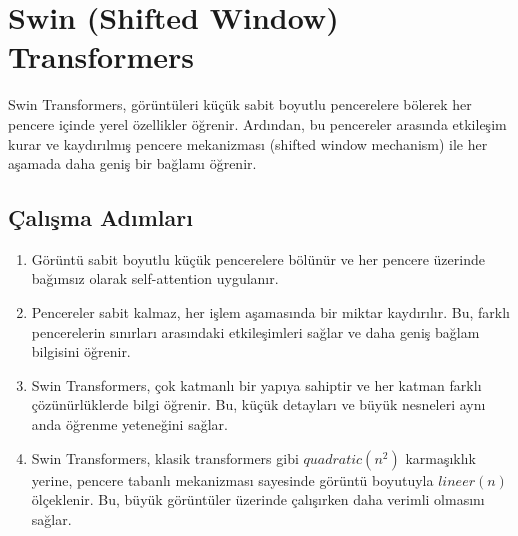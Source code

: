 \section{Swin (Shifted Window) Transformers}

Swin Transformers, görüntüleri küçük sabit boyutlu pencerelere bölerek her pencere içinde yerel özellikler öğrenir. Ardından, bu pencereler arasında etkileşim kurar ve kaydırılmış pencere mekanizması (shifted window mechanism) ile her aşamada daha geniş bir bağlamı öğrenir. 

\subsection{Çalışma Adımları}

\begin{enumerate}
    \item Görüntü sabit boyutlu küçük pencerelere bölünür ve her pencere üzerinde bağımsız olarak self-attention uygulanır.
    \item Pencereler sabit kalmaz, her işlem aşamasında bir miktar kaydırılır. Bu, farklı pencerelerin sınırları arasındaki etkileşimleri sağlar ve daha geniş bağlam bilgisini öğrenir.
    \item Swin Transformers, çok katmanlı bir yapıya sahiptir ve her katman farklı çözünürlüklerde bilgi öğrenir. Bu, küçük detayları ve büyük nesneleri aynı anda öğrenme yeteneğini sağlar.
    \item Swin Transformers, klasik transformers gibi $quadratic(n^2)$ karmaşıklık yerine, pencere tabanlı mekanizması sayesinde görüntü boyutuyla $lineer(n)$ ölçeklenir. Bu, büyük görüntüler üzerinde çalışırken daha verimli olmasını sağlar.
\end{enumerate}

\newpage